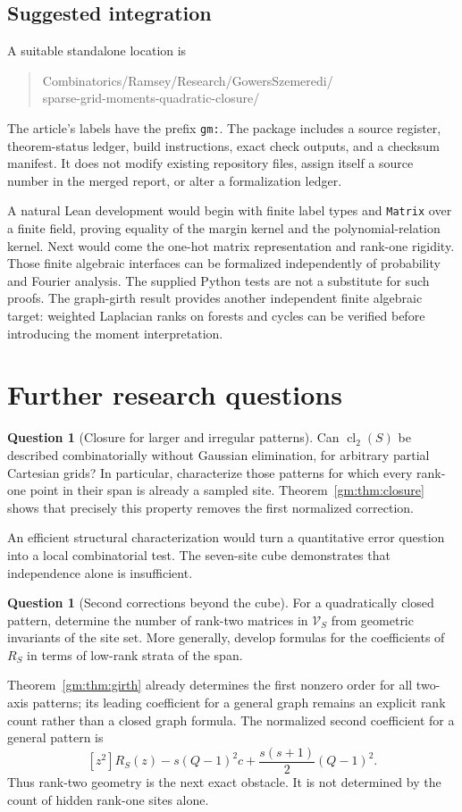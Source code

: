 \documentclass[11pt,a4paper]{article}
\numberwithin{equation}{section}
\theoremstyle{definition}
\newtheorem{question}[theorem]{Question}
\theoremstyle{remark}
\newcommand{\1}{\mathbf 1}
\newcommand{\cl}{\operatorname{cl}}
\begin{document}
\subsection{Suggested integration}
A suitable standalone location is
\begin{quote}\ttfamily\small
Combinatorics/Ramsey/Research/GowersSzemeredi/\\
sparse-grid-moments-quadratic-closure/
\end{quote}
The article's labels have the prefix \texttt{gm:}. The package includes a
source register, theorem-status ledger, build instructions, exact check
outputs, and a checksum manifest. It does not modify existing repository
files, assign itself a source number in the merged report, or alter a
formalization ledger.

A natural Lean development would begin with finite label types and
\texttt{Matrix} over a finite field, proving equality of the margin kernel
and the polynomial-relation kernel. Next would come the one-hot matrix
representation and rank-one rigidity. Those finite algebraic interfaces
can be formalized independently of probability and Fourier analysis.
The supplied Python tests are not a substitute for such proofs.
The graph-girth result provides another independent finite algebraic target:
weighted Laplacian ranks on forests and cycles can be verified before
introducing the moment interpretation.

\section{Further research questions}
\label{gm:sec:questions}

\begin{question}[Closure for larger and irregular patterns]
Can $\cl_2(S)$ be described combinatorially without Gaussian elimination,
for arbitrary partial Cartesian grids? In particular, characterize those
patterns for which every rank-one point in their span is already a sampled
site. Theorem~\ref{gm:thm:closure} shows that precisely this property removes
the first normalized correction.
\end{question}
An efficient structural characterization would turn a quantitative error
question into a local combinatorial test. The seven-site cube demonstrates
that independence alone is insufficient.

\begin{question}[Second corrections beyond the cube]
For a quadratically closed pattern, determine the number of rank-two
matrices in $\mathcal V_S$ from geometric invariants of the site set.
More generally, develop formulas for the coefficients of $R_S$ in terms
of low-rank strata of the span.
\end{question}
Theorem~\ref{gm:thm:girth} already determines the first nonzero order for
all two-axis patterns; its leading coefficient for a general graph remains
an explicit rank count rather than a closed graph formula.
The normalized second coefficient for a general pattern is
\[
 [z^2]R_S(z)-s(Q-1)^2c+\frac{s(s+1)}2(Q-1)^2.
\]
Thus rank-two geometry is the next exact obstacle. It is not determined
by the count of hidden rank-one sites alone.
\end{document}
